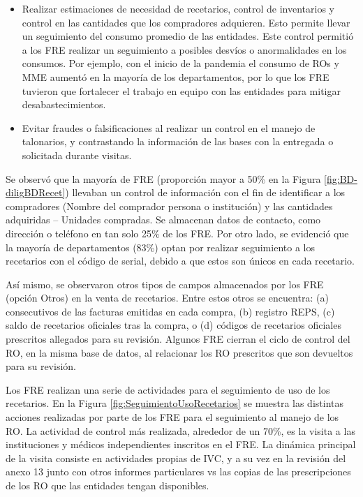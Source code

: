 \documentclass[
]{book}
\begin{document}
\begin{itemize}
\item
  Realizar estimaciones de necesidad de recetarios, control de inventarios y control en las cantidades que los compradores adquieren. Esto permite llevar un seguimiento del consumo promedio de las entidades. Este control permitió a los FRE realizar un seguimiento a posibles desvíos o anormalidades en los consumos. Por ejemplo, con el inicio de la pandemia el consumo de ROs y MME aumentó en la mayoría de los departamentos, por lo que los FRE tuvieron que fortalecer el trabajo en equipo con las entidades para mitigar desabastecimientos.
\item
  Evitar fraudes o falsificaciones al realizar un control en el manejo de talonarios, y contrastando la información de las bases con la entregada o solicitada durante visitas.
\end{itemize}

Se observó que la mayoría de FRE (proporción mayor a 50\% en la Figura \ref{fig:BD-diligBDRecet}) llevaban un control de información con el fin de identificar a los compradores (Nombre del comprador persona o institución) y las cantidades adquiridas -- Unidades compradas. Se almacenan datos de contacto, como dirección o teléfono en tan solo 25\% de los FRE. Por otro lado, se evidenció que la mayoría de departamentos (83\%) optan por realizar seguimiento a los recetarios con el código de serial, debido a que estos son únicos en cada recetario.

Así mismo, se observaron otros tipos de campos almacenados por los FRE (opción Otros) en la venta de recetarios. Entre estos otros se encuentra: (a) consecutivos de las facturas emitidas en cada compra, (b) registro REPS, (c) saldo de recetarios oficiales tras la compra, o (d) códigos de recetarios oficiales prescritos allegados para su revisión. Algunos FRE cierran el ciclo de control del RO, en la misma base de datos, al relacionar los RO prescritos que son devueltos para su revisión.

Los FRE realizan una serie de actividades para el seguimiento de uso de los recetarios. En la Figura \ref{fig:SeguimientoUsoRecetarios} se muestra las distintas acciones realizadas por parte de los FRE para el seguimiento al manejo de los RO. La actividad de control más realizada, alrededor de un 70\%, es la visita a las instituciones y médicos independientes inscritos en el FRE. La dinámica principal de la visita consiste en actividades propias de IVC, y a su vez en la revisión del anexo 13 junto con otros informes particulares vs las copias de las prescripciones de los RO que las entidades tengan disponibles.
\end{document}
